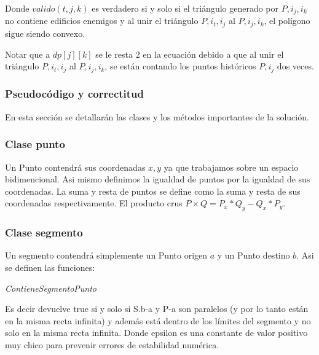 Donde $valido(t,j,k)$ es verdadero si y solo si el triángulo generado por $P, i_j, i_k$ no contiene edificios enemigos
y al unir el triángulo $P, i_t, i_j$ al $P, i_j, i_k$, el polígono sigue siendo convexo.

Notar que a $dp[j][k]$ se le resta 2 en la ecuación debido a que al unir el triángulo $P, i_t, i_j$ al $P, i_j, i_k$,
se están contando los puntos históricos $P, i_j$ dos veces.

\subsubsection{Pseudocódigo y correctitud}

En esta sección se detallarán las clases y los métodos importantes de la solución.

\subsubsection*{Clase punto}

Un Punto contendrá sus coordenadas $x,y$ ya que trabajamos sobre un espacio bidimencional. Asi mismo definimos
la igualdad de puntos por la igualdad de sus coordenadas. La suma y resta de puntos se define como la suma y resta
de sus coordenadas respectivamente. El producto crus $P \times Q = P_x * Q_y - Q_x * P_y$.

\subsubsection{Clase segmento}

Un segmento contendrá simplemente un Punto origen $a$ y un Punto destino $b$. Asi se definen las funciones:

\begin{algorithm}[H]
	\caption{\textit{ContieneSegmentoPunto}}
\end{algorithm}

Es decir devuelve true si y solo si S.b-a y P-a son paralelos (y por lo tanto están en la misma recta infinita)
y además está dentro de los límites del segmento y no solo en la misma recta infinita.
Donde epsilon es una constante de valor positivo muy chico para prevenir errores de estabilidad numérica.

